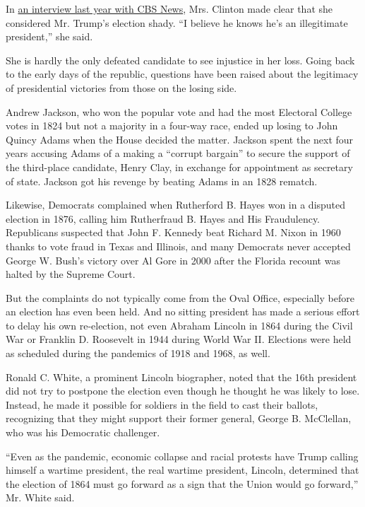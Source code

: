 In
\href{https://www.cbsnews.com/video/hillary-clinton-trump-knows-hes-an-illegitimate-president/\#x}{an
interview last year with CBS News}, Mrs. Clinton made clear that she
considered Mr. Trump's election shady. ``I believe he knows he's an
illegitimate president,'' she said.

She is hardly the only defeated candidate to see injustice in her loss.
Going back to the early days of the republic, questions have been raised
about the legitimacy of presidential victories from those on the losing
side.

Andrew Jackson, who won the popular vote and had the most Electoral
College votes in 1824 but not a majority in a four-way race, ended up
losing to John Quincy Adams when the House decided the matter. Jackson
spent the next four years accusing Adams of a making a ``corrupt
bargain'' to secure the support of the third-place candidate, Henry
Clay, in exchange for appointment as secretary of state. Jackson got his
revenge by beating Adams in an 1828 rematch.

Likewise, Democrats complained when Rutherford B. Hayes won in a
disputed election in 1876, calling him Rutherfraud B. Hayes and His
Fraudulency. Republicans suspected that John F. Kennedy beat Richard M.
Nixon in 1960 thanks to vote fraud in Texas and Illinois, and many
Democrats never accepted George W. Bush's victory over Al Gore in 2000
after the Florida recount was halted by the Supreme Court.

But the complaints do not typically come from the Oval Office,
especially before an election has even been held. And no sitting
president has made a serious effort to delay his own re-election, not
even Abraham Lincoln in 1864 during the Civil War or Franklin D.
Roosevelt in 1944 during World War II. Elections were held as scheduled
during the pandemics of 1918 and 1968, as well.

Ronald C. White, a prominent Lincoln biographer, noted that the 16th
president did not try to postpone the election even though he thought he
was likely to lose. Instead, he made it possible for soldiers in the
field to cast their ballots, recognizing that they might support their
former general, George B. McClellan, who was his Democratic challenger.

``Even as the pandemic, economic collapse and racial protests have Trump
calling himself a wartime president, the real wartime president,
Lincoln, determined that the election of 1864 must go forward as a sign
that the Union would go forward,'' Mr. White said.

